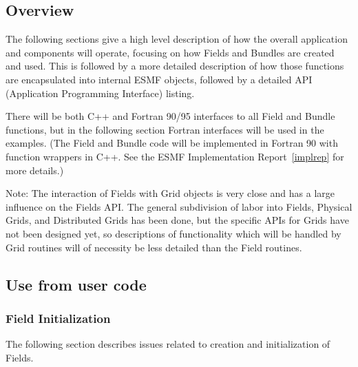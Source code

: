


\subsection{Overview}

The following sections give a high level description of how
the overall application and components will operate,
focusing on how Fields and Bundles are created and used.
This is followed by a more detailed description of how
those functions are encapsulated into internal ESMF 
objects, followed by a detailed API (Application Programming
Interface) listing.

There will be both C++ and Fortran 90/95 interfaces to
all Field and Bundle functions, but in the following section
Fortran interfaces will be used in the examples.
(The Field and Bundle code will be
implemented in Fortran 90 with function wrappers in C++.
See the ESMF Implementation 
Report~\ref{implrep} for more details.)

Note: The interaction of Fields with Grid objects is very close
and has a large influence on the Fields API.  The general
subdivision of labor into Fields, Physical Grids, and
Distributed Grids has been done, but the specific APIs for
Grids have not been designed yet, so descriptions of 
functionality which will be handled by Grid routines 
will of necessity be less detailed than the Field routines.



\subsection{Use from user code}


\subsubsection{Field Initialization}

The following section describes issues related to
creation and initialization of Fields.

